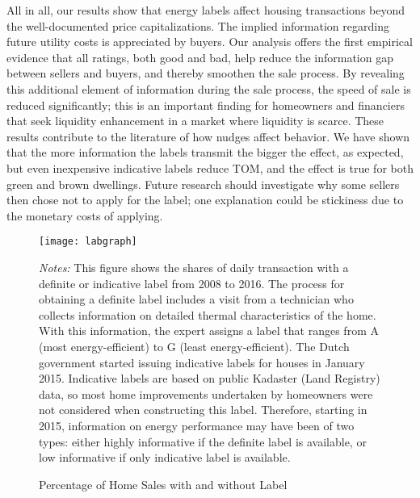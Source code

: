 \documentclass[12pt]{article}
\begin{document}
All in all, our results show that energy labels affect housing transactions beyond the well-documented price capitalizations. The implied information regarding future utility costs is appreciated by buyers. Our analysis offers the first empirical evidence that all ratings, both good and bad, help reduce the information gap between sellers and buyers, and thereby smoothen the sale process. By revealing this additional element of information during the sale process, the speed of sale is reduced significantly; this is an important finding for homeowners and financiers that seek liquidity enhancement in a market where liquidity is scarce. These results contribute to the literature of how nudges affect behavior. We have shown that the more information the labels transmit the bigger the effect, as expected, but even inexpensive indicative labels reduce TOM, and the effect is true for both green and brown dwellings. Future research should investigate why some sellers then chose not to apply for the label; one explanation could be stickiness due to the monetary costs of applying.

\newpage



\clearpage
\newpage

\begin{figure}[H]
\footnotesize
\caption{Percentage of Home Sales with and without Label}
\begin{center}
\texttt{[image: labgraph]}
		\scriptsize
		\begin{tablenotes}
		\scriptsize
\item \textit{Notes:} This figure shows the shares of daily transaction with a definite or indicative label from 2008 to 2016. The process for obtaining a definite label includes a visit from a technician who collects information on detailed thermal characteristics of the home. With this information, the expert assigns a label that ranges from A (most energy-efficient) to G (least energy-efficient). The Dutch government started issuing indicative labels for houses in January 2015. Indicative labels are based on public Kadaster (Land Registry) data, so most home improvements undertaken by homeowners were not considered when constructing this label. Therefore, starting in 2015, information on energy performance may have been of two types: either highly informative if the definite label is available, or low informative if only indicative label is available.

\end{tablenotes}
		
\end{center}
\end{figure}
\end{document}
